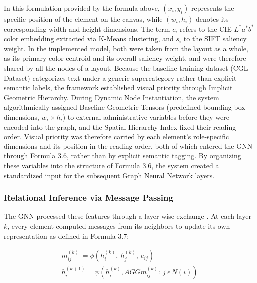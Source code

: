 \begin{refsection}
In this formulation provided by the formula above, $(x_i, y_i)$ represents the specific position of the element on the canvas, while $(w_i, h_i)$ denotes its corresponding width and height dimensions. The term $c_i$ refers to the CIE $L^*a^*b^*$ color embedding extracted via K-Means clustering, and $s_i$ to the SIFT saliency weight. In the implemented model, both were taken from the layout as a whole, as its primary color centroid and its overall saliency weight, and were therefore shared by all the nodes of a layout. Because the baseline training dataset (CGL-Dataset) categorizes text under a generic supercategory rather than explicit semantic labels, the framework established visual priority through Implicit Geometric Hierarchy. During Dynamic Node Instantiation, the system algorithmically assigned Baseline Geometric Tensors (predefined bounding box dimensions, $w_i \times h_i$) to external administrative variables before they were encoded into the graph, and the Spatial Hierarchy Index fixed their reading order. Visual priority was therefore carried by each element's role-specific dimensions and its position in the reading order, both of which entered the GNN through Formula 3.6, rather than by explicit semantic tagging. By organizing these variables into the structure of Formula 3.6, the system created a standardized input for the subsequent Graph Neural Network layers.

\subsubsection{Relational Inference via Message Passing}
The GNN processed these features through a layer-wise exchange \cite{Bronstein2023Geometric}. At each layer $k$, every element computed messages from its neighbors to update its own representation as defined in Formula 3.7:

\begin{center}
\begin{minipage}{0.8\textwidth}
\begin{equation}
\begin{aligned}
m_{ij}^{(k)}\ =\phi(h_i^{(k)},\ h_j^{(k)},\ e_{ij}) \\
h_i^{(k+1)}=\psi(h_i^{(k)},AGG{m_{ij}^{(k)}:\ j\ \epsilon\ N(i)})
\end{aligned}
\end{equation}
\centering
\end{minipage}
\end{center}


\end{refsection}
